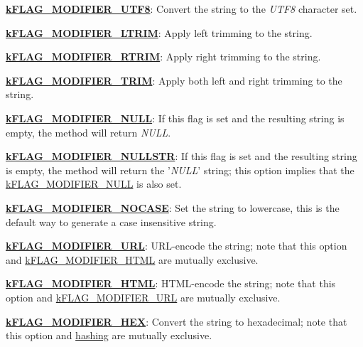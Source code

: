 \begin{DoxyItemize}
\item {\bfseries \hyperlink{}{k\-F\-L\-A\-G\-\_\-\-M\-O\-D\-I\-F\-I\-E\-R\-\_\-\-U\-T\-F8}}\-: Convert the string to the {\itshape U\-T\-F8} character set. 
\item {\bfseries \hyperlink{}{k\-F\-L\-A\-G\-\_\-\-M\-O\-D\-I\-F\-I\-E\-R\-\_\-\-L\-T\-R\-I\-M}}\-: Apply left trimming to the string. 
\item {\bfseries \hyperlink{}{k\-F\-L\-A\-G\-\_\-\-M\-O\-D\-I\-F\-I\-E\-R\-\_\-\-R\-T\-R\-I\-M}}\-: Apply right trimming to the string. 
\item {\bfseries \hyperlink{}{k\-F\-L\-A\-G\-\_\-\-M\-O\-D\-I\-F\-I\-E\-R\-\_\-\-T\-R\-I\-M}}\-: Apply both left and right trimming to the string. 
\item {\bfseries \hyperlink{}{k\-F\-L\-A\-G\-\_\-\-M\-O\-D\-I\-F\-I\-E\-R\-\_\-\-N\-U\-L\-L}}\-: If this flag is set and the resulting string is empty, the method will return {\itshape N\-U\-L\-L}. 
\begin{DoxyItemize}
\item {\bfseries \hyperlink{}{k\-F\-L\-A\-G\-\_\-\-M\-O\-D\-I\-F\-I\-E\-R\-\_\-\-N\-U\-L\-L\-S\-T\-R}}\-: If this flag is set and the resulting string is empty, the method will return the '{\itshape N\-U\-L\-L}' string; this option implies that the \hyperlink{}{k\-F\-L\-A\-G\-\_\-\-M\-O\-D\-I\-F\-I\-E\-R\-\_\-\-N\-U\-L\-L} is also set. 
\end{DoxyItemize}
\item {\bfseries \hyperlink{}{k\-F\-L\-A\-G\-\_\-\-M\-O\-D\-I\-F\-I\-E\-R\-\_\-\-N\-O\-C\-A\-S\-E}}\-: Set the string to lowercase, this is the default way to generate a case insensitive string. 
\item {\bfseries \hyperlink{}{k\-F\-L\-A\-G\-\_\-\-M\-O\-D\-I\-F\-I\-E\-R\-\_\-\-U\-R\-L}}\-: U\-R\-L-\/encode the string; note that this option and \hyperlink{}{k\-F\-L\-A\-G\-\_\-\-M\-O\-D\-I\-F\-I\-E\-R\-\_\-\-H\-T\-M\-L} are mutually exclusive. 
\item {\bfseries \hyperlink{}{k\-F\-L\-A\-G\-\_\-\-M\-O\-D\-I\-F\-I\-E\-R\-\_\-\-H\-T\-M\-L}}\-: H\-T\-M\-L-\/encode the string; note that this option and \hyperlink{}{k\-F\-L\-A\-G\-\_\-\-M\-O\-D\-I\-F\-I\-E\-R\-\_\-\-U\-R\-L} are mutually exclusive. 
\item {\bfseries \hyperlink{}{k\-F\-L\-A\-G\-\_\-\-M\-O\-D\-I\-F\-I\-E\-R\-\_\-\-H\-E\-X}}\-: Convert the string to hexadecimal; note that this option and \hyperlink{}{hashing} are mutually exclusive. 
\begin{DoxyItemize}

\end{DoxyItemize}
\end{DoxyItemize}
